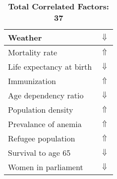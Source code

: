 \documentclass[12pt,notitlepage,oneside]{report}
\begin{document}
\begin{table}[!htb]
\begin{tabular}{|l|l|}
Weather & $\Downarrow$\\ \hline
Mortality rate & $\Uparrow$\\ \hline
Life expectancy at birth & $\Downarrow$\\ \hline
Immunization & $\Uparrow$\\ \hline
Age dependency ratio & $\Downarrow$\\ \hline
Population density & $\Uparrow$\\ \hline
Prevalance of anemia & $\Uparrow$\\ \hline
Refugee population & $\Uparrow$\\ \hline
Survival to age 65 & $\Downarrow$\\ \hline
Women in parliament & $\Downarrow$\\ \hline
\end{tabular}
\caption*{\textbf{Total Correlated Factors: 37}}
\end{table}
\clearpage
\end{document}

